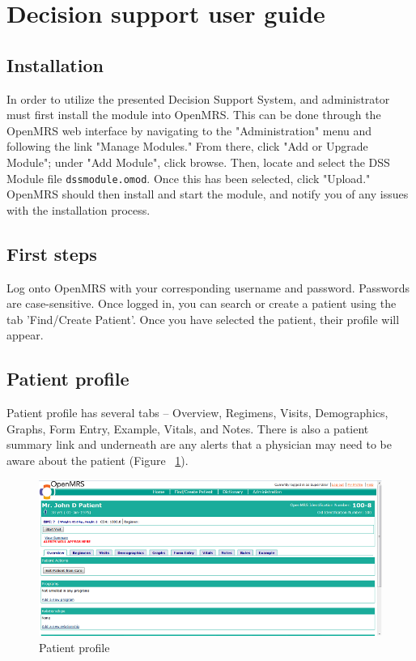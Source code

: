 \documentclass[12pt,letterpaper]{article}
\begin{document}
\newpage 
\section{Decision support user guide} \label{sec:USER_GUIDE}

\subsection{Installation}
	In order to utilize the presented Decision Support System, 
and administrator must first install the module into OpenMRS. This can 
be done through the OpenMRS web interface by navigating to the "Administration" menu and following the link "Manage Modules." From there, 
click "Add or Upgrade Module"; under "Add Module", click browse. Then, 
locate and select the DSS Module file \texttt{dssmodule.omod}. Once 
this has been selected, click "Upload." OpenMRS should then install and 
start the module, and notify you of any issues with the installation 
process.

\subsection{First steps}
	Log onto OpenMRS with your corresponding username and password. Passwords are case-sensitive. Once logged in, you can search or create a patient using the tab 'Find/Create Patient'. Once you have selected the patient, their profile will appear.

\subsection{Patient profile}
	Patient profile has several tabs – Overview, Regimens, Visits, Demographics, Graphs, Form Entry, Example, Vitals, and Notes.  There is also a patient summary link and underneath are any alerts that a physician may need to be aware about the patient (Figure ~\ref{fig:PATIENT_PROFILE}).

\begin{figure}\begin{center}
\includegraphics[width=6.5in]{user_guide/patient_profile.png}
\end{center}
\caption{Patient profile}
\label{fig:PATIENT_PROFILE}
\end{figure}
\end{document}
